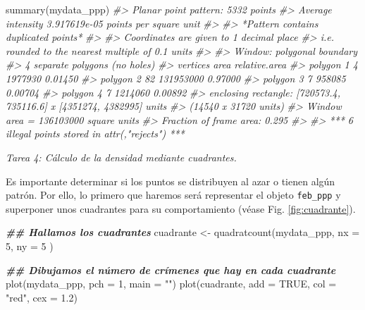 \documentclass[
]{report}
\newenvironment{Shaded}{\begin{snugshade}}{\end{snugshade}}
\newcommand{\AttributeTok}[1]{\textcolor[rgb]{0.77,0.63,0.00}{#1}}
\newcommand{\CommentTok}[1]{\textcolor[rgb]{0.56,0.35,0.01}{\textit{#1}}}
\newcommand{\ConstantTok}[1]{\textcolor[rgb]{0.00,0.00,0.00}{#1}}
\newcommand{\DecValTok}[1]{\textcolor[rgb]{0.00,0.00,0.81}{#1}}
\newcommand{\DocumentationTok}[1]{\textcolor[rgb]{0.56,0.35,0.01}{\textbf{\textit{#1}}}}
\newcommand{\FloatTok}[1]{\textcolor[rgb]{0.00,0.00,0.81}{#1}}
\newcommand{\FunctionTok}[1]{\textcolor[rgb]{0.00,0.00,0.00}{#1}}
\newcommand{\NormalTok}[1]{#1}
\newcommand{\OtherTok}[1]{\textcolor[rgb]{0.56,0.35,0.01}{#1}}
\newcommand{\StringTok}[1]{\textcolor[rgb]{0.31,0.60,0.02}{#1}}
\theoremstyle{definition}
\theoremstyle{definition}
\theoremstyle{definition}
\theoremstyle{definition}
\theoremstyle{remark}
\begin{document}
\begin{Shaded}
\begin{Highlighting}[]
\FunctionTok{summary}\NormalTok{(mydata\_ppp)}
\CommentTok{\#\textgreater{} Planar point pattern:  5332 points}
\CommentTok{\#\textgreater{} Average intensity 3.917619e{-}05 points per square unit}
\CommentTok{\#\textgreater{} }
\CommentTok{\#\textgreater{} *Pattern contains duplicated points*}
\CommentTok{\#\textgreater{} }
\CommentTok{\#\textgreater{} Coordinates are given to 1 decimal place}
\CommentTok{\#\textgreater{} i.e. rounded to the nearest multiple of 0.1 units}
\CommentTok{\#\textgreater{} }
\CommentTok{\#\textgreater{} Window: polygonal boundary}
\CommentTok{\#\textgreater{} 4 separate polygons (no holes)}
\CommentTok{\#\textgreater{}            vertices      area relative.area}
\CommentTok{\#\textgreater{} polygon 1         4   1977930       0.01450}
\CommentTok{\#\textgreater{} polygon 2        82 131953000       0.97000}
\CommentTok{\#\textgreater{} polygon 3         7    958085       0.00704}
\CommentTok{\#\textgreater{} polygon 4         7   1214060       0.00892}
\CommentTok{\#\textgreater{} enclosing rectangle: [720573.4, 735116.6] x [4351274, 4382995] units}
\CommentTok{\#\textgreater{}                      (14540 x 31720 units)}
\CommentTok{\#\textgreater{} Window area = 136103000 square units}
\CommentTok{\#\textgreater{} Fraction of frame area: 0.295}
\CommentTok{\#\textgreater{} }
\CommentTok{\#\textgreater{} *** 6 illegal points stored in attr(,"rejects") ***}
\end{Highlighting}
\end{Shaded}

\emph{Tarea 4: Cálculo de la densidad mediante cuadrantes.}

Es importante determinar si los puntos se distribuyen al azar o tienen algún
patrón. Por ello, lo primero que haremos será representar el objeto \texttt{feb\_ppp} y
superponer unos cuadrantes para su comportamiento (véase Fig.
\ref{fig:cuadrante}).

\begin{Shaded}
\begin{Highlighting}[]
\DocumentationTok{\#\# Hallamos los cuadrantes}
\NormalTok{cuadrante }\OtherTok{\textless{}{-}} \FunctionTok{quadratcount}\NormalTok{(mydata\_ppp,}
  \AttributeTok{nx =} \DecValTok{5}\NormalTok{,}
  \AttributeTok{ny =} \DecValTok{5}
\NormalTok{)}

\DocumentationTok{\#\# Dibujamos el número de crímenes que hay en cada cuadrante}
\FunctionTok{plot}\NormalTok{(mydata\_ppp, }\AttributeTok{pch =} \DecValTok{1}\NormalTok{, }\AttributeTok{main =} \StringTok{""}\NormalTok{)}
\FunctionTok{plot}\NormalTok{(cuadrante, }\AttributeTok{add =} \ConstantTok{TRUE}\NormalTok{, }\AttributeTok{col =} \StringTok{"red"}\NormalTok{, }\AttributeTok{cex =} \FloatTok{1.2}\NormalTok{)}
\end{Highlighting}
\end{Shaded}
\end{document}
